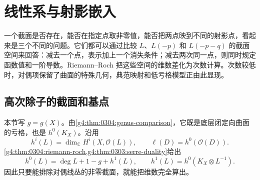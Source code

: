 
% 
% 
% 

\section{线性系与射影嵌入}
\label{g4:sec:0305}

一个截面是否存在，能否在指定点取非零值，能否把两点映到不同的射影点，看起来是三个不同的问题。它们都可以通过比较 \(L\)、\(L(-p)\) 和 \(L(-p-q)\) 的截面空间来回答：减去一个点，表示加上一个消失条件；减去两次同一点，则同时规定函数值和一阶导数。Riemann--Roch 把这些空间的维数差化为次数计算。次数较低时，对偶项保留了曲面的特殊几何，典范映射和低亏格模型正由此显现。

\subsection{高次除子的截面和基点}
\label{g4:subsec:0305:01}

本节写 \(g=g(X)\)。由\cref{g4:thm:0304:genus-comparison}，它既是底层闭定向曲面的亏格，也是 \(h^0(K_X)\)。沿用
\[
	h^i(L)=\dim_{\mathbb C}H^i(X,\mathcal O(L)),\qquad
	\ell(D)=h^0(\mathcal O(D)).
\]
\cref{g4:thm:0304:riemann-roch,g4:thm:0303:serre-duality}给出
\begin{equation}\label{g4:eq:0305:rr-duality}
	h^0(L)=\deg L+1-g+h^1(L),
	\qquad
	h^1(L)=h^0(K_X\otimes L^{-1}).
\end{equation}
因此只要能排除对偶线丛的非零截面，就能把维数完全算出。

